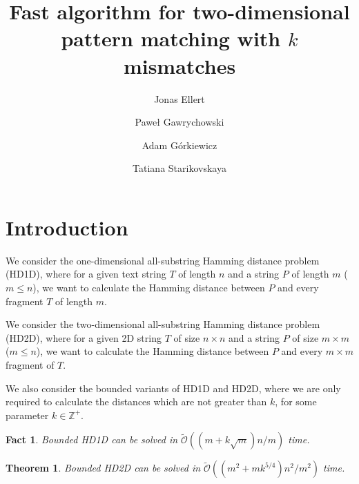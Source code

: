 \documentclass[11pt]{article}
\title{Fast algorithm for two-dimensional pattern matching with $k$ mismatches}
\author[1]{Jonas Ellert}
\author[2]{Paweł Gawrychowski}
\author[3]{Adam Górkiewicz}
\author[4]{Tatiana Starikovskaya}
\affil[1]{?}
\affil[2]{?}
\affil[3]{?}
\affil[4]{?}
\newcommand{\Z}{\mathbb{Z}}
\newcommand{\tO}{\tilde{\mathcal{O}}}
\theoremstyle{plain}
\newtheorem{theorem}{Theorem}
\newtheorem{fact}{Fact}
\theoremstyle{definition}
\begin{document}
\date{}
\maketitle

\begin{abstract}
\end{abstract}



\section{Introduction}



\newcommand{\hd}{\textsc{HD1D}\xspace}
\newcommand{\HD}{\textsc{HD2D}\xspace}

We consider the one-dimensional all-substring Hamming distance problem (\hd), where for a given text string $T$ of length $n$ and a string $P$ of length $m$ ($m \le n$), we want to calculate the Hamming distance between $P$ and every fragment $T$ of length $m$.

We consider the two-dimensional all-substring Hamming distance problem (\HD), where for a given 2D string $T$ of size $n \times n$ and a string $P$ of size $m \times m$ ($m \le n$), we want to calculate the Hamming distance between $P$ and every $m \times m$ fragment of $T$.

We also consider the bounded variants of \hd and \HD, where we are only required to calculate the distances which are not greater than $k$, for some parameter $k \in \Z^+$.

\begin{fact}
	Bounded \hd can be solved in $\tO((m + k \sqrt{m})n / m)$ time.
\end{fact}


\begin{theorem}
	\label{main result}
	Bounded \HD can be solved in $\tO((m^2 + mk^{5/4})n^2 / m^2)$ time.
\end{theorem}
\end{document}
